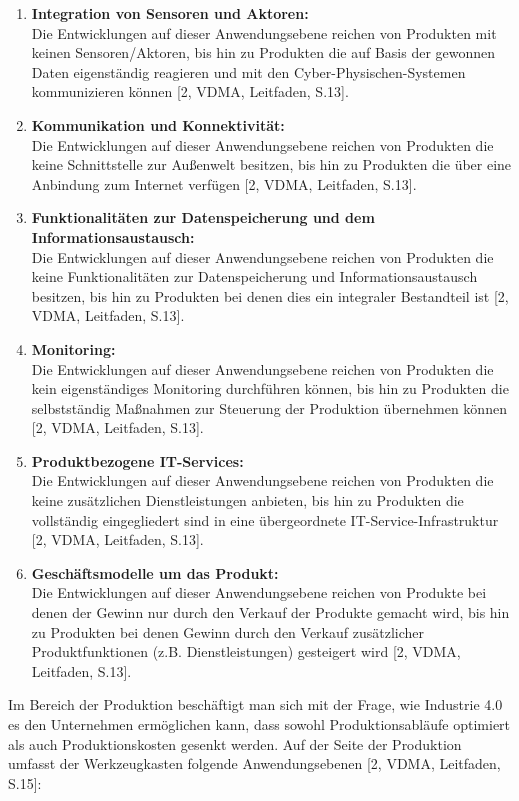 \begin{enumerate}
	\item \textbf{Integration von Sensoren und Aktoren:} \\ Die Entwicklungen auf dieser Anwendungsebene reichen von Produkten mit keinen Sensoren/Aktoren, bis hin zu Produkten die auf Basis der gewonnen Daten eigenständig reagieren und mit den Cyber-Physischen-Systemen kommunizieren können [2, VDMA, Leitfaden, S.13].
	\item \textbf{Kommunikation und Konnektivität:} \\ Die Entwicklungen auf dieser Anwendungsebene reichen von Produkten die keine Schnittstelle zur Außenwelt besitzen, bis hin zu Produkten die über eine Anbindung zum Internet verfügen [2, VDMA, Leitfaden, S.13].
	\item \textbf{Funktionalitäten zur Datenspeicherung und dem Informationsaustausch:} \\ Die Entwicklungen auf dieser Anwendungsebene reichen von Produkten die keine Funktionalitäten zur Datenspeicherung und Informationsaustausch besitzen, bis hin zu Produkten bei denen dies ein integraler Bestandteil ist [2, VDMA, Leitfaden, S.13].
	\item \textbf{Monitoring:} \\ Die Entwicklungen auf dieser Anwendungsebene reichen von Produkten die kein eigenständiges Monitoring durchführen können, bis hin zu Produkten die selbstständig Maßnahmen zur Steuerung der Produktion übernehmen können [2, VDMA, Leitfaden, S.13].
	\item \textbf{Produktbezogene IT-Services:} \\ Die Entwicklungen auf dieser Anwendungsebene reichen von Produkten die keine zusätzlichen Dienstleistungen anbieten, bis hin zu Produkten die vollständig eingegliedert sind in eine übergeordnete IT-Service-Infrastruktur [2, VDMA, Leitfaden, S.13].
	\item \textbf{Geschäftsmodelle um das Produkt:} \\ Die Entwicklungen auf dieser Anwendungsebene reichen von Produkte bei denen der Gewinn nur durch den Verkauf der Produkte gemacht wird, bis hin zu Produkten bei denen Gewinn durch den Verkauf zusätzlicher Produktfunktionen (z.B. Dienstleistungen) gesteigert wird [2, VDMA, Leitfaden, S.13].
\end{enumerate}
Im Bereich der Produktion beschäftigt man sich mit der Frage, wie Industrie 4.0 es den Unternehmen ermöglichen kann, dass sowohl Produktionsabläufe optimiert als auch Produktionskosten gesenkt werden. Auf der Seite der Produktion umfasst der Werkzeugkasten folgende Anwendungsebenen [2, VDMA, Leitfaden, S.15]:

